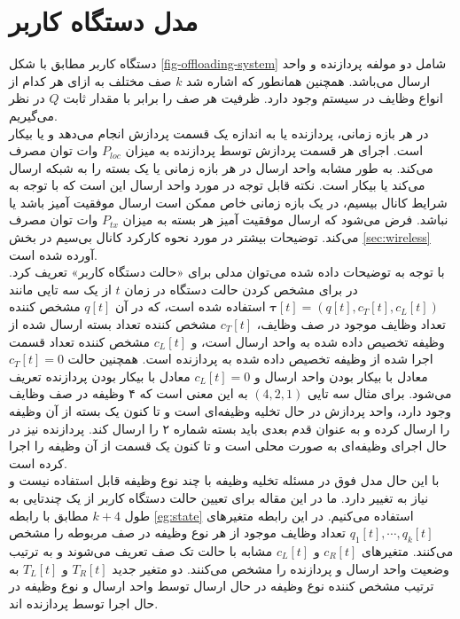 \section{مدل دستگاه کاربر}
\label{sec:ue-model}
دستگاه کاربر مطابق با شکل \ref{fig-offloading-system} شامل دو مولفه پردازنده و واحد ارسال می‌باشد. همچنین همانطور که اشاره شد \(k\) صف مختلف به ازای هر کدام از انواع وظایف در سیستم وجود دارد. ظرفیت هر صف را برابر با مقدار ثابت \(Q\) در نظر می‌گیریم. \\

در هر بازه زمانی، پردازنده یا به اندازه یک قسمت پردازش انجام می‌دهد و یا بیکار است. اجرای هر قسمت پردازش توسط پردازنده به میزان
\(P_{l o c}\)
وات توان مصرف می‌کند. به طور مشابه واحد ارسال در هر بازه زمانی یا یک بسته را به شبکه ارسال می‌کند یا بیکار است. نکته قابل توجه در مورد واحد ارسال این است که با توجه به شرایط کانال بیسیم، در یک بازه زمانی خاص ممکن است ارسال موفقیت آمیز باشد یا نباشد. فرض می‌شود که ارسال موفقیت آمیز هر بسته به میزان
\(P_{t x}\)
وات توان مصرف می‌کند. توضیحات بیشتر در مورد نحوه کارکرد کانال بی‌سیم در بخش \ref{sec:wireless} آورده شده است. \\

با توجه به توضیحات داده شده می‌توان مدلی برای «حالت دستگاه کاربر» تعریف کرد. در \cite{Liu} برای مشخص کردن حالت دستگاه در زمان \(t\) از یک سه تایی مانند $\boldsymbol{\tau}[t]=\left(q[t], c_{T}[t], c_{L}[t]\right)$ استفاده شده است، که در آن \(q[t]\) مشخص کننده تعداد وظایف موجود در صف وظایف، \(c_T[t]\) مشخص کننده تعداد بسته ارسال شده از وظیفه تخصیص داده شده به واحد ارسال است، و \(c_L[t]\) مشخص کننده تعداد قسمت اجرا شده از وظیفه تخصیص داده شده به پردازنده است. همچنین حالت \(c_T[t] = 0\) معادل با بیکار بودن واحد ارسال و \(c_L[t] = 0\) معادل با بیکار بودن پردازنده تعریف می‌شود. برای مثال سه تایی \((4, 2, 1)\) به این معنی است که ۴ وظیفه در صف وظایف وجود دارد، واحد پردازش در حال تخلیه وظیفه‌ای است و تا کنون یک بسته از آن وظیفه را ارسال کرده و به عنوان قدم بعدی باید بسته شماره ۲ را ارسال کند. پردازنده نیز در حال اجرای وظیفه‌ای به صورت محلی است و تا کنون یک قسمت از آن وظیفه را اجرا کرده است. \\
\newpage
با این حال مدل فوق در مسئله تخلیه وظیفه با چند نوع وظیفه قابل استفاده نیست و نیاز به تغییر دارد. ما در این مقاله برای تعیین حالت دستگاه کاربر از یک چندتایی به طول \(k + 4\) مطابق با رابطه \ref{eg:state} استفاده می‌کنیم. در این رابطه متغیرهای
\(q_1[t], \cdots, q_k[t]\)
تعداد وظایف موجود از هر نوع وظیفه در صف مربوطه را مشخص می‌کنند. متغیرهای \(c_R[t]\) و \(c_L[t]\) مشابه با حالت تک صف تعریف می‌شوند و به ترتیب وضعیت واحد ارسال و پردازنده را مشخص می‌کنند. دو متغیر جدید \(T_R[t]\) و \(T_L[t]\) به ترتیب مشخص کننده نوع وظیفه در حال ارسال توسط واحد ارسال و نوع وظیفه در حال اجرا توسط پردازنده اند.

